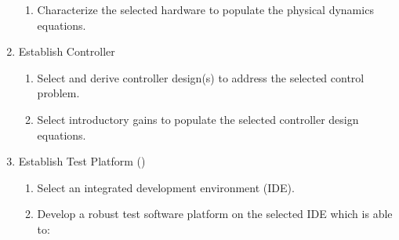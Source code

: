 \documentclass[crop=false,float=true,class=scrreprt]{standalone}
\begin{document}
\begin{enumerate}[leftmargin=*]
\begin{enumerate}[leftmargin=*]
  \item Characterize the selected hardware to populate the physical dynamics equations.               %
      
\end{enumerate}                                                                                        \vspace{-0.5em}

\item Establish Controller

\begin{enumerate}[leftmargin=*]                                                                        \vspace{-1em}

  \item Select and derive controller design(s) to address the selected control problem.               %
                                                        \vspace{-1em}
      
  \item Select introductory gains to populate the selected controller design equations.               %
      
\end{enumerate}                                                                                        \vspace{-0.5em}

\item Establish Test Platform {\fns()}

\begin{enumerate}[leftmargin=*]                                                                        \vspace{-1em}

  \item Select an integrated development environment (IDE).                                           %
                                                  \vspace{-1em}

      
  \item Develop a robust test software platform on the selected IDE which is able to:
  

\end{enumerate}
\end{enumerate}
\end{document}
